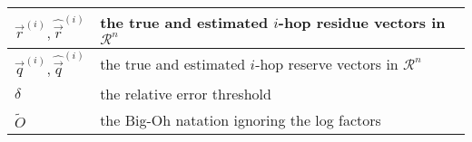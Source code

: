 \begin{table} [t]
\begin{small}
\begin{tabular} {|l|p{2.3in}|}
			$\vec{r}^{(i)},\hat{\vec{r}}^{(i)}$ & the true and estimated $i$-hop residue vectors in $\mathcal{R}^n$\\ \hline
			$\vec{q}^{(i)},\hat{\vec{q}}^{(i)}$ & the true and estimated $i$-hop reserve vectors in $\mathcal{R}^n$\\ \hline
			$\delta$ & the relative error threshold \\ \hline
			$\tilde{O}$ & the Big-Oh natation ignoring the log factors \\ \hline
			

\end{tabular}
\end{small}
\end{table}
